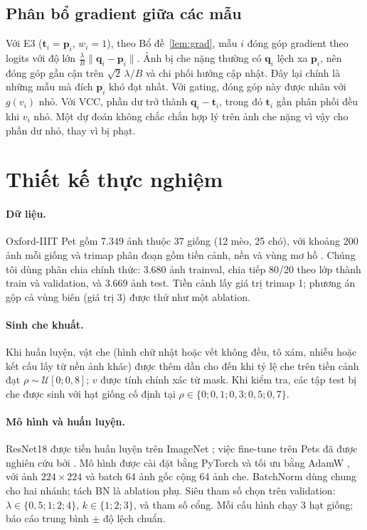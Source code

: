 \documentclass[11pt,a4paper]{article}
\theoremstyle{plain}
\theoremstyle{definition}
\theoremstyle{remark}
\newcommand{\bp}{\bm{p}}
\newcommand{\bq}{\bm{q}}
\newcommand{\bt}{\bm{t}}
\begin{document}
\subsection{Phân bổ gradient giữa các mẫu}

Với E3 ($\bt_i=\bp_i$, $w_i=1$), theo Bổ đề~\ref{lem:grad}, mẫu $i$ đóng góp gradient theo logits với độ lớn $\tfrac{\lambda}{B}\|\bq_i-\bp_i\|$. Ảnh bị che nặng thường có $\bq_i$ lệch xa $\bp_i$, nên đóng góp gần cận trên $\sqrt2\,\lambda/B$ và chi phối hướng cập nhật. Đây lại chính là những mẫu mà đích $\bp_i$ khó đạt nhất. Với gating, đóng góp này được nhân với $g(v_i)$ nhỏ. Với VCC, phần dư trở thành $\bq_i-\bt_i$, trong đó $\bt_i$ gần phân phối đều khi $v_i$ nhỏ. Một dự đoán không chắc chắn hợp lý trên ảnh che nặng vì vậy cho phần dư nhỏ, thay vì bị phạt.

\section{Thiết kế thực nghiệm}
\label{sec:exp}

\paragraph{Dữ liệu.} Oxford-IIIT Pet gồm 7.349 ảnh thuộc 37 giống (12 mèo, 25 chó), với khoảng 200 ảnh mỗi giống và trimap phân đoạn gồm tiền cảnh, nền và vùng mơ hồ \cite{parkhi2012cats}. Chúng tôi dùng phân chia chính thức: 3.680 ảnh trainval, chia tiếp 80/20 theo lớp thành train và validation, và 3.669 ảnh test. Tiền cảnh lấy giá trị trimap 1; phương án gộp cả vùng biên (giá trị 3) được thử như một ablation.

\paragraph{Sinh che khuất.} Khi huấn luyện, vật che (hình chữ nhật hoặc vết không đều, tô xám, nhiễu hoặc kết cấu lấy từ nền ảnh khác) được thêm dần cho đến khi tỷ lệ che trên tiền cảnh đạt $\rho\sim\mathcal{U}[0;0{,}8]$; $v$ được tính chính xác từ mask. Khi kiểm tra, các tập test bị che được sinh với hạt giống cố định tại $\rho\in\{0;0{,}1;0{,}3;0{,}5;0{,}7\}$.

\paragraph{Mô hình và huấn luyện.} ResNet18 \cite{he2016deep} được tiền huấn luyện trên ImageNet \cite{russakovsky2015imagenet}; việc fine-tune trên Pets đã được nghiên cứu bởi \cite{kornblith2019better}. Mô hình được cài đặt bằng PyTorch \cite{paszke2019pytorch} và tối ưu bằng AdamW \cite{loshchilov2019decoupled}, với ảnh $224\times224$ và batch 64 ảnh gốc cộng 64 ảnh che. BatchNorm dùng chung cho hai nhánh; tách BN \cite{xie2020advprop,merchant2020split} là ablation phụ. Siêu tham số chọn trên validation: $\lambda\in\{0{,}5;1;2;4\}$, $k\in\{1;2;3\}$, và tham số cổng. Mỗi cấu hình chạy 3 hạt giống; báo cáo trung bình $\pm$ độ lệch chuẩn.
\end{document}
